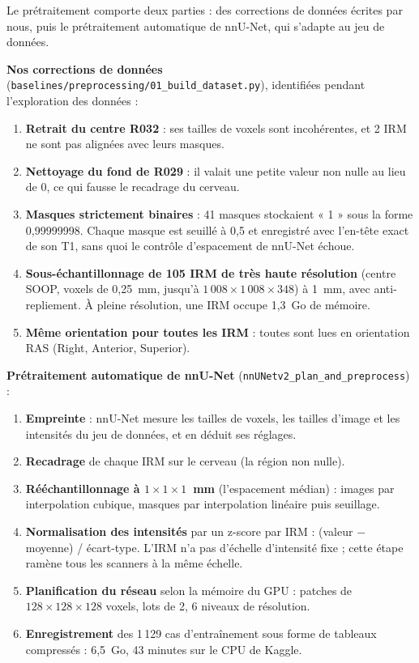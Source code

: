 Le prétraitement comporte deux parties : des corrections de données écrites par nous, puis le prétraitement automatique de nnU-Net, qui s'adapte au jeu de données.

\textbf{Nos corrections de données} (\nolinkurl{baselines/preprocessing/01_build_dataset.py}), identifiées pendant l'exploration des données :
\begin{enumerate}
  \item \textbf{Retrait du centre R032} : ses tailles de voxels sont incohérentes, et 2 IRM ne sont pas alignées avec leurs masques.
  \item \textbf{Nettoyage du fond de R029} : il valait une petite valeur non nulle au lieu de 0, ce qui fausse le recadrage du cerveau.
  \item \textbf{Masques strictement binaires} : 41 masques stockaient « 1 » sous la forme 0,99999998. Chaque masque est seuillé à 0,5 et enregistré avec l'en-tête exact de son T1, sans quoi le contrôle d'espacement de nnU-Net échoue.
  \item \textbf{Sous-échantillonnage de 105 IRM de très haute résolution} (centre SOOP, voxels de 0,25~mm, jusqu'à $1\,008 \times 1\,008 \times 348$) à 1~mm, avec anti-repliement. À pleine résolution, une IRM occupe 1,3~Go de mémoire.
  \item \textbf{Même orientation pour toutes les IRM} : toutes sont lues en orientation RAS (Right, Anterior, Superior).
\end{enumerate}

\textbf{Prétraitement automatique de nnU-Net} (\texttt{nnUNetv2\_plan\_and\_preprocess}) :
\begin{enumerate}
  \item \textbf{Empreinte} : nnU-Net mesure les tailles de voxels, les tailles d'image et les intensités du jeu de données, et en déduit ses réglages.
  \item \textbf{Recadrage} de chaque IRM sur le cerveau (la région non nulle).
  \item \textbf{Rééchantillonnage à $1 \times 1 \times 1$~mm} (l'espacement médian) : images par interpolation cubique, masques par interpolation linéaire puis seuillage.
  \item \textbf{Normalisation des intensités} par un z-score par IRM : (valeur $-$ moyenne) / écart-type. L'IRM n'a pas d'échelle d'intensité fixe ; cette étape ramène tous les scanners à la même échelle.
  \item \textbf{Planification du réseau} selon la mémoire du GPU : patches de $128 \times 128 \times 128$ voxels, lots de 2, 6 niveaux de résolution.
  \item \textbf{Enregistrement} des 1\,129 cas d'entraînement sous forme de tableaux compressés : 6,5~Go, 43 minutes sur le CPU de Kaggle.
\end{enumerate}


